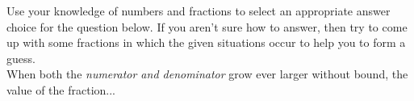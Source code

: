 \documentclass[10pt]{article}
\begin{document}
\newpage%
\lform  \blue{\bf $\dfrac{\infty}{\infty}$}


 Use your knowledge of numbers and fractions to select an appropriate answer choice for the question below. If you aren't sure how to answer, then try to come up with some fractions in which the given situations occur to help you to form a guess.\\

When both the {\it numerator and denominator} grow ever larger without bound, the value of the fraction...\\
\\
\end{document}

